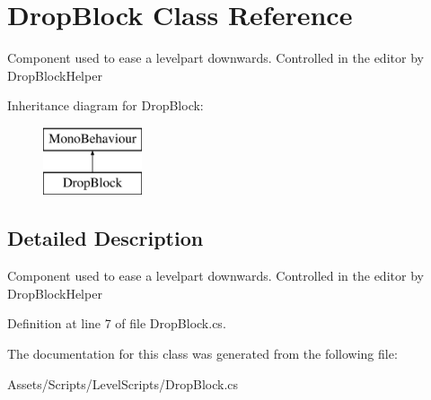 \hypertarget{class_drop_block}{\section{Drop\+Block Class Reference}
\label{class_drop_block}
}


Component used to ease a levelpart downwards. Controlled in the editor by Drop\+Block\+Helper  


Inheritance diagram for Drop\+Block\+:\begin{figure}[H]
\begin{center}
\leavevmode
\includegraphics[height=2.000000cm]{class_drop_block}
\end{center}
\end{figure}


\subsection{Detailed Description}
Component used to ease a levelpart downwards. Controlled in the editor by Drop\+Block\+Helper 



Definition at line 7 of file Drop\+Block.\+cs.



The documentation for this class was generated from the following file\+:\begin{DoxyCompactItemize}
\item 
Assets/\+Scripts/\+Level\+Scripts/Drop\+Block.\+cs\end{DoxyCompactItemize}
